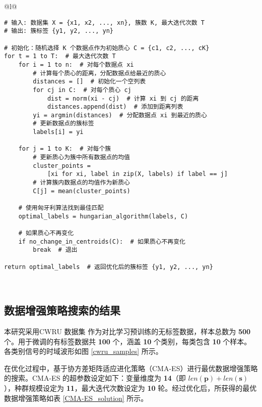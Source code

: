\documentclass[master]{thesis-uestc}
\begin{document}
\begin{table}[h]
    \caption{KMeans算法伪代码}
    \begin{tabular}{@{}l@{}} %
    \toprule
     \\ %
    \midrule
    \begin{lstlisting}[basicstyle=\ttfamily,frame=none]
# 输入: 数据集 X = {x1, x2, ..., xn}, 簇数 K, 最大迭代次数 T
# 输出: 簇标签 {y1, y2, ..., yn}

# 初始化：随机选择 K 个数据点作为初始质心 C = {c1, c2, ..., cK}
for t = 1 to T:  # 最大迭代次数 T
    for i = 1 to n:  # 对每个数据点 xi
        # 计算每个质心的距离，分配数据点给最近的质心
        distances = []  # 初始化一个空列表
        for cj in C:  # 对每个质心 cj
            dist = norm(xi - cj)  # 计算 xi 到 cj 的距离
            distances.append(dist)  # 添加到距离列表
        yi = argmin(distances)  # 分配数据点 xi 到最近的质心
        # 更新数据点的簇标签
        labels[i] = yi
    
    for j = 1 to K:  # 对每个簇
        # 更新质心为簇中所有数据点的均值
        cluster_points = 
            [xi for xi, label in zip(X, labels) if label == j]
        # 计算簇内数据点的均值作为新质心
        C[j] = mean(cluster_points)
    
    # 使用匈牙利算法找到最佳匹配
    optimal_labels = hungarian_algorithm(labels, C)
    
    # 如果质心不再变化
    if no_change_in_centroids(C):  # 如果质心不再变化
        break  # 退出

return optimal_labels  # 返回优化后的簇标签 {y1, y2, ..., yn}
    \end{lstlisting} \\
    \bottomrule
    \end{tabular}
    \label{table:kmeans_code}
\end{table}

\subsection{数据增强策略搜索的结果}
\label{sec:CMA-ES_result}

本研究采用CWRU 数据集 作为对比学习预训练的无标签数据，样本总数为 \textbf{500} 个。用于微调的有标签数据共 \textbf{100} 个，涵盖 \textbf{10} 个类别，每类包含 \textbf{10} 个样本。各类别信号的时域波形如图 \ref{cwru_samples} 所示。

在优化过程中，基于协方差矩阵适应进化策略（CMA-ES）进行最优数据增强策略的搜索。CMA-ES 的超参数设定如下：变量维度为 \textbf{14}（即 \(len(\mathbf{p}) + len(\mathbf{s})\)），种群规模设定为 \textbf{11}，最大迭代次数设定为 \textbf{10} 轮。经过优化后，所获得的最优数据增强策略如表 \ref{CMA-ES_solution} 所示。
\end{document}
